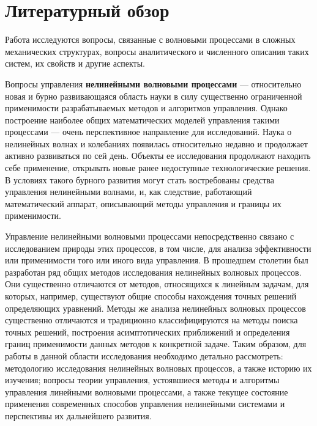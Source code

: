\chapter{Литературный обзор}


Работа исследуются вопросы, связанные с волновыми процессами в сложных механических структурах, вопросы аналитического и численного описания таких систем, их свойств и другие аспекты.

Вопросы управления \textbf{нелинейными волновыми процессами} --- относительно новая и бурно развивающаяся область науки в силу существенно ограниченной применимости разрабатываемых методов и алгоритмов управления. Однако построение наиболее общих математических моделей управления такими процессами --- очень перспективное направление для исследований. Наука о нелинейных волнах и колебаниях появилась относительно недавно и продолжает активно развиваться по сей день. Объекты ее исследования продолжают находить себе применение, открывать новые ранее недоступные технологические решения. В условиях такого бурного развития могут стать востребованы средства управления нелинейными волнами, и, как следствие, работающий математический аппарат, описывающий методы управления и границы их применимости.

Управление нелинейными волновыми процессами непосредственно связано с исследованием природы этих процессов, в том числе, для анализа эффективности или применимости того или иного вида управления. В прошедшем столетии был разработан ряд общих методов исследования нелинейных волновых процессов. Они существенно отличаются от методов, относящихся к линейным задачам, для которых, например, существуют общие способы нахождения точных решений определяющих уравнений. Методы же анализа нелинейных волновых процессов существенно отличаются и традиционно классифицируются на методы поиска точных решений, построения асимптотических приближений и определения границ применимости данных методов к конкретной задаче. Таким образом, для работы в данной области исследования необходимо детально рассмотреть: методологию исследования нелинейных волновых процессов, а также историю их изучения; вопросы теории управления, устоявшиеся методы и алгоритмы управления линейными волновыми процессами, а также текущее состояние применения современных способов управления нелинейными системами и перспективы их дальнейшего развития.

